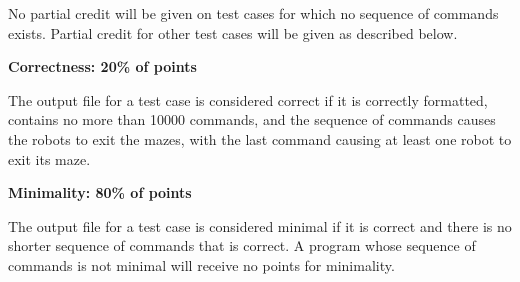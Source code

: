 No partial credit will be given on test cases for which no sequence of commands exists. Partial credit for other test cases will be given as described below.

\textbf{Correctness: 20\% of points}

The output file for a test case is considered correct if it is correctly formatted, contains no more than 10000 commands, and the sequence of commands causes the robots to exit the mazes, with the last command causing at least one robot to exit its maze.

\textbf{Minimality: 80\% of points}

The output file for a test case is considered minimal if it is correct and there is no shorter sequence of commands that is correct. A program whose sequence of commands is not minimal will receive no points for minimality.